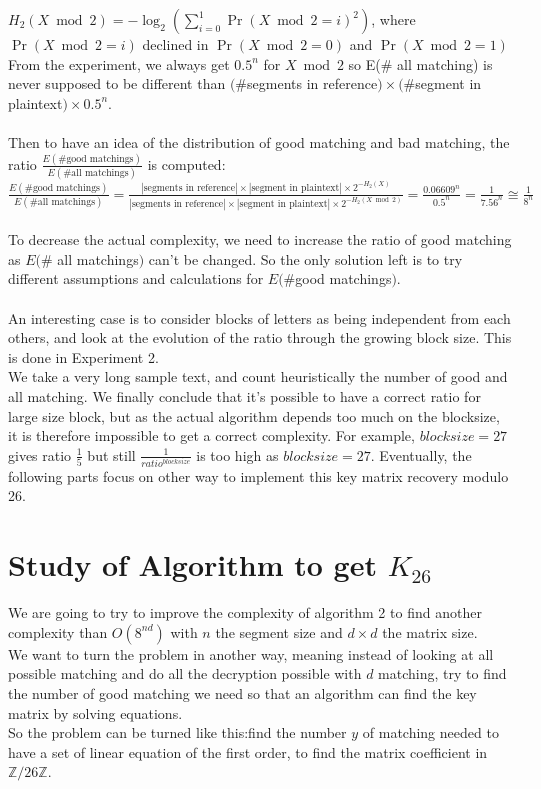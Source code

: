 \documentclass{article}
\begin{document}
$H_{2}(X \bmod 2) = -\log_2(\sum_{i=0}^{1}{\Pr(X \bmod 2 =i)^2})$, where $\Pr(X \bmod 2=i)$ declined in $\Pr(X \bmod 2=0)$ and $\Pr(X \bmod 2 =1)$\\
From the experiment, we always get $0.5^n$ for $X \bmod 2$ so E(\# all matching) is never supposed to be different than $(\# $segments in reference$) \times (\#$segment in plaintext$) \times 0.5^n$.\\
\\
Then to have an idea of the distribution of good matching and bad matching, the ratio $\frac{E(\# \text{good matchings})}{E(\# \text{all matchings})}$ is computed: $\frac{E(\# \text{good matchings})}{E(\# \text{all matchings})} = \frac{|\text{segments in reference}| \times |\text{segment in plaintext}| \times 2^{-H_{2}(X)}}{|\text{segments in reference}| \times |\text{segment in plaintext}| \times 2^{-H_{2}(X \bmod 2)}}  = \frac{0.06609^n}{0.5^n} = \frac{1}{7.56^n} \cong \frac{1}{8^n} $\\
\\
To decrease the actual complexity, we need to increase the ratio of good matching as $E(\#$ all matchings$)$ can't be changed. So the only solution left is to try different assumptions and calculations for $E(\# $good matchings$)$.\\
\\
An interesting case is to consider blocks of letters as being independent from each others, and look at the evolution of the ratio through the growing block size. This is done in Experiment 2.\\
We take a very long sample text, and count heuristically the number of good and all matching. 
We finally conclude that it's possible to have a correct ratio for large size block, but as the actual algorithm depends too much on the blocksize, it is therefore impossible to get a correct complexity. For example, $blocksize=27$ gives ratio $\frac{1}{5}$ but still $\frac{1}{ratio^{blocksize}}$ is too high as $blocksize = 27$.
Eventually, the following parts focus on other way to implement this key matrix recovery modulo 26.\\

\section{Study of Algorithm to get $K_{26}$}
We are going to try to improve the complexity of algorithm 2 to find another complexity than $O(8^{nd})$ with $n$ the segment size and $d \times d$ the matrix size.\\
We want to turn the problem in another way, meaning instead of looking at all possible matching and do all the decryption possible with $d$ matching, try to find  the number of good matching we need so that an algorithm can find the key matrix by solving equations.\\
So the problem can be turned like this:find the number $y$ of matching needed to have a set of linear equation of the first order, to find the matrix coefficient in $\mathbb{Z}/26\mathbb{Z}$.\\
\end{document}
